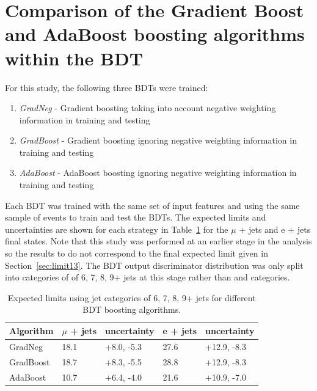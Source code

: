 \section{Comparison of the Gradient Boost and AdaBoost boosting algorithms within the BDT \label{app:adagrad}}

For this study, the following three BDTs were trained:
\begin{enumerate}
\item \emph{GradNeg} - Gradient boosting taking into account negative weighting information in training and testing
\item \emph{GradBoost} - Gradient boosting ignoring negative weighting information in training and testing
\item \emph{AdaBoost} - AdaBoost boosting ignoring negative weighting information in training and testing
\end{enumerate}
%
Each BDT was trained with the same set of input features and using the same sample of events to train and test the BDTs. The expected limits and uncertainties are shown for each strategy in Table~\ref{tab:BDTalgos} for the $\mu$ + jets and e + jets final states. Note that this study was performed at an earlier stage in the analysis so the results to do not correspond to the final expected limit given in Section~\ref{sec:limit13}. The BDT output discriminator distribution was only split into \njets categories of of 6, 7, 8, 9+ jets at this stage rather than \njets and \nMtags categories.



\begin{table}[ht]
\centering
\caption{Expected limits using jet categories of 6, 7, 8, 9+ jets for different BDT boosting algorithms.}
\label{tab:BDTalgos}
\begin{tabular}{|l|l|l|l|l|}
\hline
Algorithm & $\mu$ + jets & uncertainty & e + jets & uncertainty \\ \hline
GradNeg   & 18.1         & +8.0, -5.3  & 27.6     & +12.9, -8.3 \\ \hline
GradBoost & 18.7         & +8.3, -5.5  & 28.8     & +12.9, -8.3 \\ \hline
AdaBoost  & 10.7         & +6.4, -4.0  & 21.6     & +10.9, -7.0 \\ \hline
\end{tabular}
\end{table}

